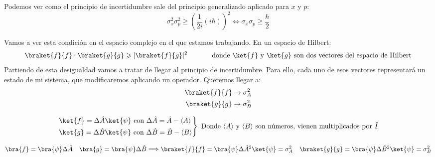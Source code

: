\documentclass{report}
\begin{document}
    \noindent Podemos ver como el principio de incertidumbre sale del principio
    generalizado aplicado para $x$ y $p$: 
    \[\sigma_x^2\sigma_p^2\geq\left(\dfrac{1}{2i}(i\hbar)\right)^2\Longleftrightarrow
    \sigma_x\sigma_p\geq\dfrac{\hbar}{2}\]

    \noindent Vamos a ver esta condición en el espacio complejo en el que estamos
    trabajando. En un espacio de Hilbert:
    \[\braket{f}{f}\cdot\braket{g}{g}\geq\abs{\braket{f}{g}}^2\ \hspace{1cm}
    \text{ donde }\ket{f}\text{ y }\ket{g}\text{ son dos vectores del espacio de Hilbert}\]
    \noindent Partiendo de esta desigualdad vamos a tratar de llegar al principio de
    incertidumbre. Para ello, cada uno de esos vectores representará un estado de mi 
    sistema, que modificaremos aplicando un operador. Queremos llegar a:
    \[\begin{aligned}
        \braket{f}{f}\rightarrow\sigma_A^2\\
        \braket{g}{g}\rightarrow\sigma_B^2
    \end{aligned}\]

    \[\left.\begin{aligned}
        &\ket{f}=\Delta\hat{A}\ket{\psi}\text{ con }\Delta\hat{A}=\hat{A}-\langle A\rangle\\
        &\ket{g}=\Delta\hat{B}\ket{\psi}\text{ con }\Delta\hat{B}=\hat{B}-\langle B\rangle\\
    \end{aligned}\right\}
    \text{ Donde }\langle A\rangle \text{ y }\langle B\rangle\text{ son números, vienen multiplicados por }\hat{I}\]

    \[\begin{aligned}
        &\bra{f}=\bra{\psi}\Delta\hat{A}
        &\bra{g}=\bra{\psi}\Delta\hat{B}
    \end{aligned}\Longrightarrow 
    \begin{aligned}
      &\braket{f}{f}=\bra{\psi}\Delta\hat{A}^2\ket{\psi}=\sigma_A^2
      &\braket{g}{g}=\bra{\psi}\Delta\hat{B}^2\ket{\psi}=\sigma_B^2
    \end{aligned}\]
    
\end{document}
